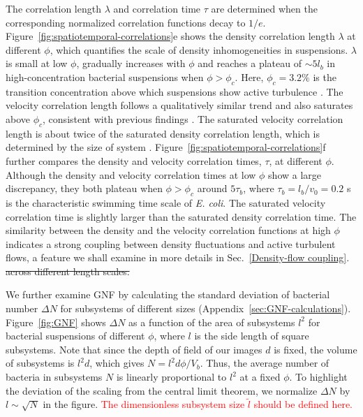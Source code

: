 \documentclass[twocolumn,aps,prx,amsmath,amssymb,longbibliography,superscriptaddress]{revtex4-2}
\begin{document}
The correlation length $\lambda$ and correlation time $\tau$ are determined when the corresponding normalized correlation functions decay to $1/e$. Figure~\ref{fig:spatiotemporal-correlations}e shows the density correlation length $\lambda$ at different $\phi$, which quantifies the scale of density inhomogeneities in suspensions.
$\lambda$ is small at low $\phi$, gradually increases with $\phi$ and reaches a plateau of $\sim 5l_b$ in high-concentration bacterial suspensions when $\phi > \phi_c$. Here, $\phi_c = 3.2\%$ is the transition concentration above which suspensions show active turbulence \cite{Peng2020}.
The velocity correlation length follows a qualitatively similar trend and also saturates above $\phi_c$, consistent with previous findings \cite{Sokolov2007}. The saturated velocity correlation length is about twice of the saturated density correlation length, which is determined by the size of system \cite{Guo2018}.  Figure~\ref{fig:spatiotemporal-correlations}f further compares the density and velocity correlation times, $\tau$, at different $\phi$. Although the density and velocity correlation times at low $\phi$ show a large discrepancy, they both plateau when $\phi > \phi_c$ around $5\tau_b$, where $\tau_b=l_b/v_0=0.2$ s is the characteristic swimming time scale of \textit{E. coli}. The saturated velocity correlation time is slightly larger than the saturated density correlation time. The similarity between the density and the velocity correlation functions at high $\phi$ indicates a strong coupling between density fluctuations and active turbulent flows, a feature we shall
examine in more details in Sec.~\ref{Density-flow coupling}. \sout{across different length scales.}


We further examine GNF by calculating the standard deviation of bacterial number $\Delta N$ for subsystems of different sizes (Appendix~\ref{sec:GNF-calculations}). Figure~\ref{fig:GNF} shows $\Delta N$ as a function of the area of subsystems $l^2$ for bacterial suspensions of different $\phi$, where $l$ is the side length of square subsystems. Note that since the depth of field of our images $d$ is fixed, the volume of subsystems is $l^2 d$, which gives $N = l^2d \phi/V_b$. Thus, the average number of bacteria in subsystems $N$ is linearly proportional to $l^2$ at a fixed $\phi$. To highlight the deviation of the scaling from the central limit theorem, we normalize $\Delta N$ by $l \sim \sqrt N$ in the figure. \textcolor{red}{The dimensionless subsystem size $\tilde{l}$ should be defined here.}
\end{document}
